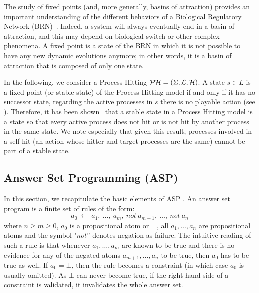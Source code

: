 The study of fixed points (and, more generally, basins of attraction) provides an important understanding of the different behaviors of a Biological Regulatory Network (BRN)~\cite{wuensche1998genomic}.
Indeed, a system will always eventually end in a basin of attraction,
and this may depend on biological switch or other complex phenomena.
A fixed point is a state of the BRN in which it is not possible to have any new dynamic evolutions anymore;
in other words, it is a basin of attraction that is composed of only one state.

In the following, we consider a Process Hitting $\mathcal{PH} = (\Sigma, \mathcal{L}, \mathcal{H})$.
A state $s \in L$ is a fixed point (or stable state) of the Process Hitting model if and only if it has no successor state, \ie regarding the active processes in $s$ there is no playable action (see ).
Therefore, it has been shown~\cite{PMR10-TCSB} that
a stable state in a Process Hitting model is a state so that
every active process does not hit or is not hit by another process in the same state.
We note especially that given this result, processes involved in a self-hit (an action whose hitter and target processes are the same) cannot be part of a stable state.

\subsection{Answer Set Programming (ASP)}

In this section, we recapitulate the basic elements of ASP \cite{baral2003knowledge, Vladimir, Glimpse}.
An answer set program is a finite set of rules of the form:
  \[a_{0}\ \leftarrow \ a_{1},\ \ldots,\ a_{m},\ not\ a_{m+1},\ \ldots,\ not\ a_{n}\]
where $n \ge m \ge 0$, $a_{0}$ is a propositional atom or $\bot$, all
$a_{1}, \ldots ,a_{n}$ are propositional atoms and the symbol "$not$'' denotes  negation as failure.
The intuitive reading of such a rule is that whenever $a_{1}, \ldots, a_{m}$
are known to be true and there is no evidence for any of the negated atoms $a_{m+1}, \ldots, a_{n}$ to be true, then $a_{0}$ has to be true as well.
If $a_{0} = \bot$, then the rule becomes a constraint (in which case $a_{0}$ is usually omitted).
As $\bot$ can never become true, if the right-hand side of a constraint is validated, it invalidates the whole answer set.

